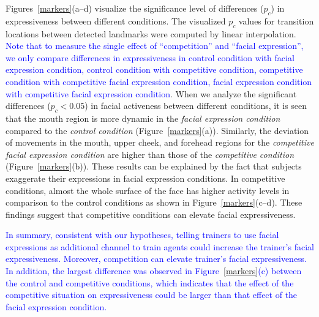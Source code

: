 Figures~\ref{markers}(a--d) visualize the significance level of
differences ($p_c$) in expressiveness between different
conditions. The visualized $p_c$ values for transition
locations between detected landmarks were computed by linear
interpolation. \textcolor{blue}{Note that to measure the single effect of ``competition'' and ``facial expression'',  we only compare differences in expressiveness in control condition with facial expression condition, control condition with competitive condition, competitive condition with competitive facial expression condition, facial expression condition with competitive facial expression condition}. When we analyze the significant differences
($p_c<0.05$) in facial activeness between different conditions,
it is seen that the mouth region is more dynamic in the \emph{facial
expression condition} compared to the \emph{control condition}
(Figure~\ref{markers}(a)). Similarly, the deviation of movements in the 
mouth, upper cheek, and forehead regions for the \emph{competitive
facial expression condition} are higher than those of the
\emph{competitive condition} (Figure~\ref{markers}(b)). These
results can be explained by the fact that subjects exaggerate
their expressions in facial expression conditions. In
competitive conditions, almost the whole surface of the face has
higher activity levels in comparison to the control conditions as
shown in Figure~\ref{markers}(c--d). These findings suggest
that competitive conditions can elevate facial expressiveness. 

\textcolor{blue}{In summary, consistent with our hypotheses, %
telling trainers to use facial expressions as additional channel to train agents could increase the trainer's facial expressiveness. Moreover, competition can elevate trainer's facial expressiveness. In addition, the largest difference was observed in Figure~\ref{markers}(c) between the control and competitive conditions, which indicates that the effect of the competitive situation on expressiveness could be larger than that effect of the facial expression condition.} %




